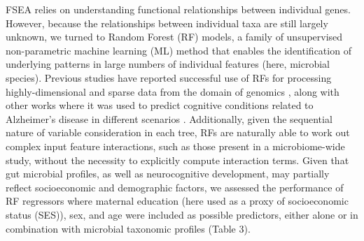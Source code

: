 \documentclass{article}
\begin{document}
FSEA relies on understanding functional relationships between individual
genes. However, because the relationships between individual taxa are
still largely unknown, we turned to Random Forest (RF) models, a family of 
unsupervised non-parametric machine learning (ML) method that enables
the identification of underlying patterns in large numbers of individual features
(here, microbial species).
Previous studies have reported
successful use of RFs for processing highly-dimensional and sparse data
from the domain of genomics
\cite{amaratungaEnrichedRandomForests2008,brieucPracticalIntroductionRandom2018,chenRandomForestsGenomic2012,franzosaGutMicrobiomeStructure2019,stephanRandomForestApproach2015},
along with other works where it was used
to predict cognitive conditions related to Alzheimer's disease in
different scenarios \cite{ardekaniPredictionIncipientAlzheimer2017,velazquezRandomForestModel2021}.
Additionally, given the sequential
nature of variable consideration in each tree, RFs are naturally able to
work out complex input feature interactions, such as those present in a
microbiome-wide study, without the necessity to explicitly compute
interaction terms. Given that gut microbial profiles, as well as neurocognitive
development, may partially reflect socioeconomic and demographic
factors, we assessed the performance of RF regressors where maternal
education (here used as a proxy of socioeconomic status (SES)),
sex, and age were included as possible predictors, either alone
or in combination with microbial taxonomic profiles (Table 3).
\end{document}
